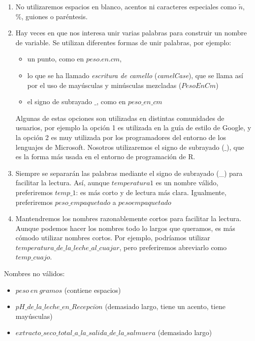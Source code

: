 \documentclass[
  letterpaper,
]{scrbook}
\providecommand{\tightlist}{%
  \setlength{\itemsep}{0pt}\setlength{\parskip}{0pt}}\usepackage{longtable,booktabs,array}
\begin{document}
\begin{enumerate}
\def\labelenumi{\arabic{enumi}.}
\setcounter{enumi}{3}
\item
  No utilizaremos espacios en blanco, acentos ni caracteres especiales
  como \(\tilde{n}\), \(\%\), guiones o paréntesis.
\item
  Hay veces en que nos interesa unir varias palabras para construir un
  nombre de variable. Se utilizan diferentes formas de unir palabras,
  por ejemplo:

  \begin{itemize}
  \item
    un punto, como en \(peso.en.cm\),
  \item
    lo que se ha llamado \emph{escritura de camello} (\emph{camelCase}),
    que se llama así por el uso de mayúsculas y minúsculas mezcladas
    (\(PesoEnCm\))
  \item
    el signo de subrayado \(\_\), como en \(peso\_en\_cm\)
  \end{itemize}

  Algunas de estas opciones son utilizadas en distintas comunidades de
  usuarios, por ejemplo la opción 1 es utilizada en la guía de estilo de
  Google, y la opción 2 es muy utilizada por los programadores del
  entorno de los lenguajes de Microsoft. Nosotros utilizaremos el signo
  de subrayado (\(\_\)), que es la forma más usada en el entorno de
  programación de R.
\item
  Siempre se separarán las palabras mediante el signo de subrayado (\_)
  para facilitar la lectura. Así, aunque \(temperatura1\) es un nombre
  válido, preferiremos \(temp\_1\): es más corto y de lectura más clara.
  Igualmente, preferiremos \(peso\_empaquetado\) a \(pesoempaquetado\)
\item
  Mantendremos los nombres razonablemente cortos para facilitar la
  lectura. Aunque podemos hacer los nombres todo lo largos que queramos,
  es más cómodo utilizar nombres cortos. Por ejemplo, podríamos utilizar
  \(temperatura\_de\_la\_leche\_al\_cuajar\), pero preferiremos
  abreviarlo como \(temp\_cuajo\).
\end{enumerate}

Nombres no válidos:

\begin{itemize}
\tightlist
\item
  \(peso\ en\ gramos\) (contiene espacios)
\item
  \(pH\_de\_la\_leche\_en\_Recepci\acute{o}n\) (demasiado largo, tiene
  un acento, tiene mayúsculas)
\item
  \(extracto\_seco\_total\_a\_la\_salida\_de\_la\_salmuera\) (demasiado
  largo)
\end{itemize}
\end{document}
